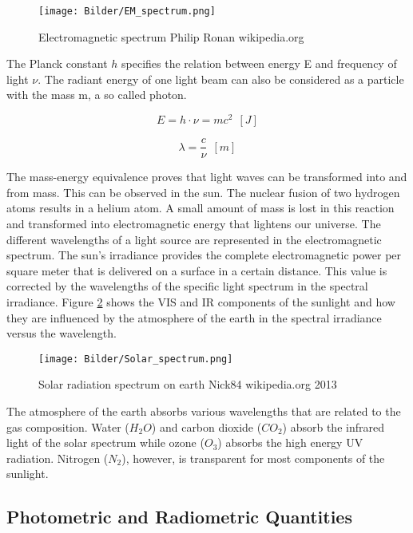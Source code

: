 \begin{figure}[!h]
	\centering
	\texttt{[image: Bilder/EM\_spectrum.png]}
	\caption{Electromagnetic spectrum \tiny Philip Ronan wikipedia.org \ccbysa}
	\label{fig:EM_spectrum}
\end{figure}

The Planck constant $h$ specifies the relation between energy E and frequency of light $\nu$. The radiant energy of one light beam can also be considered as a particle with the mass m, a so called photon.

\begin{equation}
 E =  h\cdot \nu=mc^2 ~~ [J]
\end{equation}

\begin{equation}
\lambda = \frac c \nu ~~[m]
\end{equation}
\medskip
 
 The mass-energy equivalence proves that light waves can be transformed into and from mass. This can be observed in the sun. The nuclear fusion of two hydrogen atoms results in a helium atom. A small amount of mass is lost in this reaction and transformed into electromagnetic energy that lightens our universe. The different wavelengths of a light source are represented in the electromagnetic spectrum. The sun's irradiance provides the complete electromagnetic power per square meter that is delivered on a surface in a certain distance. This value is corrected by the wavelengths of the specific light spectrum in the spectral irradiance. Figure \ref{fig:SolarSpectrum} shows the VIS and IR components of the sunlight and how they are influenced by the atmosphere of the earth in the spectral irradiance versus the wavelength.
 
\begin{figure}[!h]
	\centering
	\texttt{[image: Bilder/Solar\_spectrum.png]}
	\caption{Solar radiation spectrum on earth \tiny Nick84 wikipedia.org 2013 \ccbysa}
	\label{fig:SolarSpectrum}
\end{figure}

The atmosphere of the earth absorbs various wavelengths that are related to the gas composition. Water ($H_2O$) and carbon dioxide ($CO_2$) absorb the infrared light of the solar spectrum while ozone ($O_3$) absorbs the high energy UV radiation. Nitrogen ($N_2$), however, is transparent for most components of the sunlight.


\subsection{Photometric and Radiometric Quantities}

